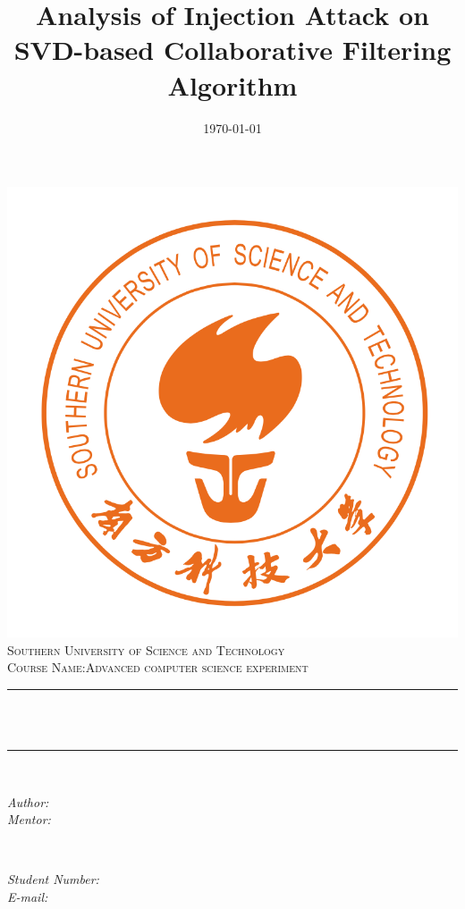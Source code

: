 \documentclass[a4paper, 12pt]{article}
\title{\Large Analysis of Injection Attack on SVD-based Collaborative Filtering Algorithm}     %
\author{}                               %
\date{\today}                                           %
\makeatletter
\theoremstyle{definition}
\let\thetitle\@title
\let\theauthor\@author
\let\thedate\@date
\makeatother
\begin{document}
\begin{titlepage}
    \centering
    \vspace*{0.5 cm}
    \includegraphics[scale = 0.4]{sustech_logo.png}\\[1.0 cm]   %
    \textsc{\Large Southern University of Science and Technology}\\[1.5 cm]   %
    \textsc{\large Course Name:Advanced computer science experiment}\\[0.5 cm]               %
    \rule{\linewidth}{0.2 mm} \\[0.5 cm]
    { \huge \bfseries \thetitle}\\
    \rule{\linewidth}{0.2 mm} \\[1.5 cm]
    
    \begin{minipage}{0.4\textwidth}
        \begin{flushleft} \large
            \emph{Author:}\\
            
            \theauthor
            \emph{Mentor:}\\
            \end{flushleft}
            \end{minipage}~
            \begin{minipage}{0.4\textwidth}
            \begin{flushright} \large
            \emph{Student Number:} \\
            \emph{E-mail:}\\               
        \end{flushright}
    \end{minipage}\\[2 cm]
    
    {\large \thedate}\\[2 cm]
 
    \vfill
    
\end{titlepage}
\end{document}
